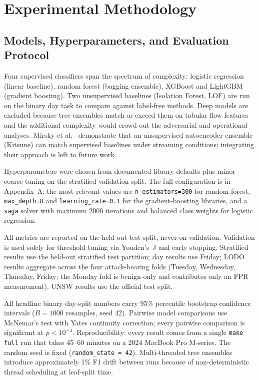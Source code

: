 \chapter{Experimental Methodology}
\label{ch:method}

\section{Models, Hyperparameters, and Evaluation Protocol}

Four supervised classifiers span the spectrum of complexity: logistic
regression (linear baseline), random forest (bagging ensemble), XGBoost
and LightGBM (gradient boosting). Two unsupervised baselines (Isolation
Forest, LOF) are run on the binary day task to compare against
label-free methods. Deep models are excluded because tree ensembles match
or exceed them on tabular flow features~\cite{Grinsztajn2022} and the
additional complexity would crowd out the adversarial and operational
analyses. Mirsky et al.~\cite{Mirsky2018} demonstrate that an
unsupervised autoencoder ensemble (Kitsune) can match supervised
baselines under streaming conditions; integrating their approach is left
to future work.

Hyperparameters were chosen from documented library defaults plus minor
coarse tuning on the stratified validation split. The full configuration
is in Appendix~A; the most relevant values are \texttt{n\_estimators=300}
for random forest, \texttt{max\_depth=8} and
\texttt{learning\_rate=0.1} for the gradient-boosting libraries, and a
\texttt{saga} solver with maximum 2000 iterations and balanced class
weights for logistic regression.

All metrics are reported on the held-out test split, never on validation.
Validation is used solely for threshold tuning via Youden's~J and early
stopping. Stratified results use the held-out stratified test partition;
day results use Friday; LODO results aggregate across the four
attack-bearing folds (Tuesday, Wednesday, Thursday, Friday; the Monday
fold is benign-only and contributes only an FPR measurement). UNSW
results use the official test split.

All headline binary day-split numbers carry 95\% percentile bootstrap
confidence intervals ($B = 1000$ resamples, seed 42). Pairwise model
comparisons use McNemar's test with Yates continuity correction;
every pairwise comparison is significant at $p < 10^{-4}$. Reproducibility:
every result comes from a single \texttt{make full} run that takes
45--60 minutes on a 2024 MacBook Pro M-series. The random seed is fixed
(\texttt{random\_state = 42}). Multi-threaded tree ensembles introduce
approximately 1\% F1 drift between runs because of non-deterministic
thread scheduling at leaf-split time.

